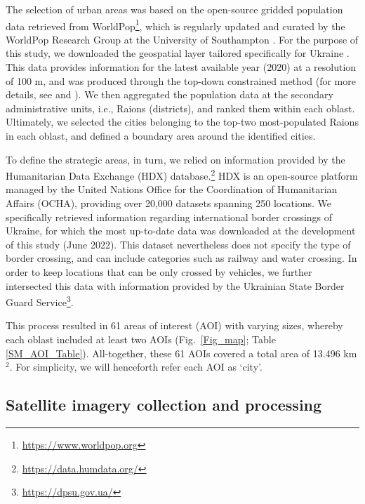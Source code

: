 \documentclass[sn-basic]{sn-jnl}%
\begin{document}
The selection of urban areas was based on the open-source gridded population data retrieved from WorldPop\footnote{\url{https://www.worldpop.org}}, which is regularly updated and curated by the WorldPop Research Group at the University of Southampton \citep{Tatem_2017}. For the purpose of this study, we downloaded the geospatial layer tailored specifically for Ukraine \citep{WorldPop_data}. This data provides information for the latest available year (2020) at a resolution of 100 m, and was produced through the top-down constrained method (for more details, see \citet{stevens_et_al_2015} and \citet{WorldPop_web}). 
We then aggregated the population data at the secondary administrative units, i.e., Raions (districts), and ranked them within each oblast. Ultimately, we selected the cities belonging to the top-two most-populated Raions in each oblast, and defined a boundary area around the identified cities.

To define the strategic areas, in turn, we relied on information provided by the Humanitarian Data Exchange (HDX) database.\footnote{\url{https://data.humdata.org/}} HDX is an open-source platform managed by the United Nations Office for the Coordination of Humanitarian Affairs (OCHA), providing over 20,000 datasets spanning 250 locations. We specifically retrieved information regarding international border crossings of Ukraine, for which the most up-to-date data was downloaded at the development of this study (June 2022). This dataset nevertheless does not specify the type of border crossing, and can include categories such as railway and water crossing. In order to keep locations that can be only crossed by vehicles, we further intersected this data with information provided by the Ukrainian State Border Guard Service\footnote{\url{https://dpsu.gov.ua/}}.

This process resulted in 61 areas of interest (AOI) with varying sizes, whereby each oblast included at least two AOIs (Fig.~\ref{Fig_map}; Table \ref{SM_AOI_Table}). All-together, these 61 AOIs covered a total area of 13.496 km$^2$. For simplicity, we will henceforth refer each AOI as `city'.

\subsection{Satellite imagery collection and processing} \label{MMS3}

\end{document}

